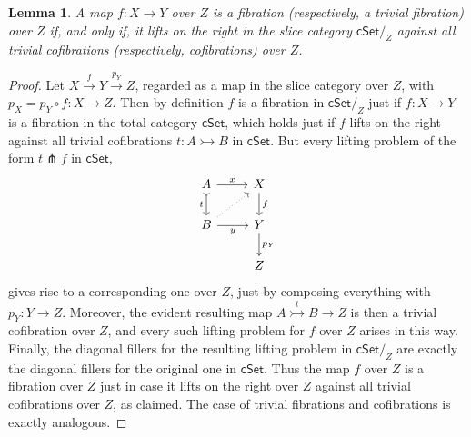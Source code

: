 \documentclass[11pt,reqno]{amsart}
\newcommand{\cSet}{\ensuremath{\mathsf{cSet}}}
\newcommand{\cSetZ}{\ensuremath{\mathsf{cSet}/_{\!Z}}}
\newcommand{\cof}{\ensuremath{\rightarrowtail}}
\renewcommand{\to}{\ensuremath{\rightarrow}}
\newcommand{\too}{\ensuremath{\longrightarrow}}
\newtheorem{lemma}[theorem]{Lemma}
\theoremstyle{remark}
\theoremstyle{definition}
\begin{document}
\begin{lemma}\label{lem:slicepremodellifting1}
A map $f : X \to Y$ over $Z$  is a fibration (respectively, a trivial fibration) over $Z$ if, and only if, it lifts on the right in the slice category $\cSetZ$ against all trivial cofibrations (respectively, cofibrations) over $Z$.
\end{lemma}
%
\begin{proof}
Let $X \stackrel{f}{\to} Y \stackrel{p_Y}{\too} Z$, regarded as a map in the slice category over $Z$, with $p_X = p_Y \circ f : X \to Z$.  Then by definition $f$ is a fibration in $\cSetZ$ just if $f : X\to Y$ is a fibration in the total category $\cSet$, which holds just if $f$ lifts on the right against all trivial cofibrations $t : A \cof B$ in $\cSet$.  But every lifting problem of the form $t\pitchfork f$ in $\cSet$,
\[\begin{tikzcd}
A \ar[d,swap,tail, "t"] \ar[r, "x" ] & X \ar[d, "f"] \\  
B  \ar[r, swap, "y" ] \ar[ru, dotted] & Y  \ar[d, "{p_Y}"] \\
& Z
 \end{tikzcd}\]
gives rise to a corresponding one over $Z$, just by composing everything with $p_Y : Y \to Z$. Moreover, the evident resulting map $A\stackrel{t}{\cof} B \to Z$ is then a trivial cofibration over $Z$,  and every such lifting problem for $f$ over $Z$ arises in this way.  Finally, the diagonal fillers for the resulting lifting problem in $\cSetZ$ are exactly the diagonal fillers for the original one in $\cSet$. Thus the map $f$ over $Z$ is a fibration over $Z$ just in case it lifts on the right over $Z$ against all trivial cofibrations over $Z$, as claimed.  The case of trivial fibrations and cofibrations is exactly analogous.
\end{proof}
\end{document}
